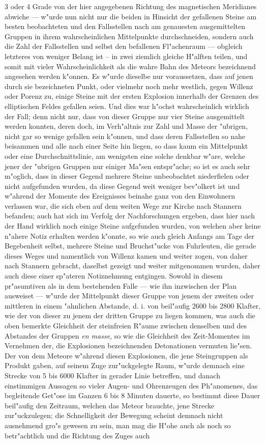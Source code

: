 \documentclass[a4paper, 11pt, oneside, german]{article}
\begin{document}
3 oder 4 Grade von der hier angegebenen Richtung des magnetischen Meridianes abwiche --- w"urde nun nicht nur die beiden in Hinsicht der gefallenen Steine am besten beobachteten und den Fallsstellen nach am genauesten ausgemittelten Gruppen in ihrem wahrscheinlichen Mittelpunkte durchschneiden, sondern auch die Zahl der Fallsstellen und selbst den befallenen Fl"achenraum --- obgleich letzteres von weniger Belang ist -- in zwei ziemlich gleiche H"alften teilen, und somit mit vieler Wahrscheinlichkeit als die wahre Bahn des Meteors bezeichnend angesehen werden k"onnen. Es w"urde dieselbe nur voraussetzen, dass auf jenen durch sie bezeichneten Punkt, oder vielmehr noch mehr westlich, gegen Willenz oder Porenz zu, einige Steine mit der ersten Explosion innerhalb der Grenzen des elliptischen Feldes gefallen seien. Und dies war h"ochst wahrscheinlich wirklich der Fall; denn nicht nur, dass von dieser Gruppe nur vier Steine ausgemittelt werden konnten, deren doch, im Verh"altnis zur Zahl und Masse der "ubrigen, nicht gar so wenige gefallen sein k"onnen, und dass deren Fallsstellen so nahe beisammen und alle nach einer Seite hin liegen, so dass kaum ein Mittelpunkt oder eine Durchschnittslinie, am wenigsten eine solche denkbar w"are, welche jener der "ubrigen Gruppen nur einiger Ma"sen entspr"ache; so ist es auch sehr m"oglich, dass in dieser Gegend mehrere Steine unbeobachtet niederfielen oder nicht aufgefunden wurden, da diese Gegend weit weniger bev"olkert ist und w"ahrend der Momente des Ereignisses beinahe ganz von den Einwohnern verlassen war, die sich eben auf dem weiten Wege zur Kirche nach Stannern befanden; auch hat sich im Verfolg der Nachforschungen ergeben, dass hier nach der Hand wirklich noch einige Steine aufgefunden wurden, von welchen aber keine n"ahere Notiz erhalten werden k"onnte, so wie auch gleich Anfangs am Tage der Begebenheit selbst, mehrere Steine und Bruchst"ucke von Fuhrleuten, die gerade dieses Weges und namentlich von Willenz kamen und weiter zogen, von daher nach Stannern gebracht, daselbst gezeigt und weiter mitgenommen wurden, daher auch diese einer sp"ateren Notiznehmung entgingen. Sowohl in diesem pr"asumtiven als in dem bestehenden Falle --- wie ihn inzwischen der Plan ausweiset --- w"urde der Mittelpunkt dieser Gruppe von jenem der zweiten oder mittleren in einem "ahnlichen Abstande, d. i. von beil"aufig 2600 bis 2800 Klafter, wie der von dieser zu jenem der dritten Gruppe zu liegen kommen, was auch die oben bemerkte Gleichheit der steinfreien R"aume zwischen denselben und des Abstandes der Gruppen \emph{en masse}, so wie die Gleichheit des Zeit-Momentes im Vernehmen der, die Explosionen bezeichnenden Detonationen vermuten lie"sen. Der von dem Meteore w"ahrend diesen Explosionen, die jene Steingruppen als Produkt gaben, auf seinem Zuge zur"uckgelegte Raum, w"urde demnach eine Strecke von 5 bis 6000 Klafter in gerader Linie betreffen, und danach einstimmigen Aussagen so vieler Augen- und Ohrenzeugen des Ph"anomenes, das begleitende Get"ose im Ganzen 6 bis 8 Minuten dauerte, so bestimmt diese Dauer beil"aufig den Zeitraum, welchen das Meteor brauchte, jene Strecke zur"uckzulegen; die Schnelligkeit der Bewegung scheint demnach nicht ausnehmend gro"s gewesen zu sein, man mag die H"ohe auch als noch so betr"achtlich und die Richtung des Zuges auch 
\end{document}
